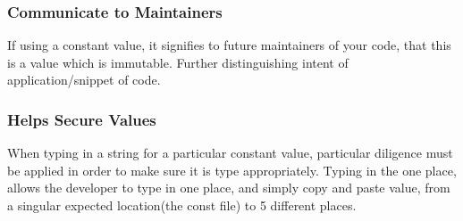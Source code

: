 \subsubsection { Communicate to Maintainers }
If using a constant value, it signifies to future maintainers of your code, that
this is a value which is immutable. Further distinguishing intent of
application/snippet of code.

\subsubsection { Helps Secure Values }
When typing in a string for a particular constant value, particular diligence
must be applied in order to make sure it is type appropriately. Typing in the
one place, allows the developer to type in one place, and simply copy and paste
value, from a singular expected location(the const file) to 5 different places.
